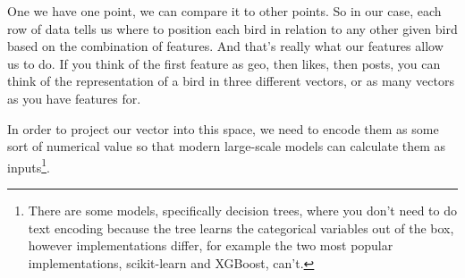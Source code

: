 \documentclass[11pt]{diazessay} %
\begin{document}


One we have one point, we can compare it to other points. So in our case, each row of data tells us where to position each bird in relation to any other given bird based on the combination of features.  And that's really what our features allow us to do. If you think of the first feature as geo, then likes, then posts, you can think of the representation of a bird in three different vectors, or as many vectors as you have features for. 

In order to project our vector into this space, we need to encode them as some sort of numerical value so that modern large-scale models\citep{lakshmanan2020machine} can calculate them as inputs\footnote{There are some models, specifically decision trees, where you don't need to do text encoding because the tree learns the categorical variables out of the box, however implementations differ, for example the two most popular implementations, scikit-learn and XGBoost\citep{altay_2020}, can't.}. 
\end{document}
